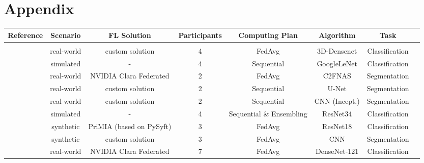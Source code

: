 \section{Appendix}
\label{sec:Appendix}






\begin{sidewaystable}
  \centering
  \begin{tabular}{cccccccc}
    Reference & Scenario & FL Solution & Participants & Computing Plan & Algorithm & Task \\
    \hline \\[-1.5ex]
    \cite{Xu2020ADiagnosis}                             & real-world & custom solution          & 4             & FedAvg                    & 3D-Densenet       & Classification \\
    \cite{Balachandar2020AccountingImaging}             & simulated  & -                        & 4             & Sequential                & GoogleLeNet       & Classification \\
    \cite{Wang2020AutomatedLearning}                    & real-world & NVIDIA Clara Federated   & 2             & FedAvg                    & C2FNAS            & Segmentation \\
    \cite{Remedios2020DistributedSegmentation}          & real-world & custom solution          & 2             & Sequential                & U-Net             & Segmentation  \\
    \cite{Remedios2019DistributedInjury}                & real-world & custom solution          & 2             & Sequential                & CNN (Incept.)     & Segmentation  \\
    \cite{Chang2018DistributedImaging}                  & simulated  & -                        & 4             & Sequential \& Ensembling  & ResNet34          & Classification \\
    \cite{Kaissis2021End-to-endImaging}                 & synthetic  & PriMIA (based on PySyft) & 3             & FedAvg                    & ResNet18          & Classification  \\
    \cite{Dou2021FederatedStudy}                        & synthetic  & custom solution          & 3             & FedAvg                    & CNN               & Segmentation \\
    \cite{Roth2020FederatedImplementation}              & real-world & NVIDIA Clara Federated   & 7             & FedAvg                    & DenseNet-121      & Classification \\

\end{tabular}
\end{sidewaystable}
